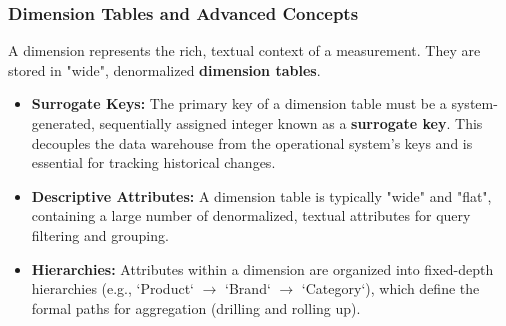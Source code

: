 \subsubsection{Dimension Tables and Advanced Concepts}
A dimension represents the rich, textual context of a measurement. They are stored in "wide", denormalized \textbf{dimension tables}.
\begin{itemize}
    \item \textbf{Surrogate Keys:} The primary key of a dimension table must be a system-generated, sequentially assigned integer known as a \textbf{surrogate key}. This decouples the data warehouse from the operational system's keys and is essential for tracking historical changes.
    \item \textbf{Descriptive Attributes:} A dimension table is typically "wide" and "flat", containing a large number of denormalized, textual attributes for query filtering and grouping.
    \item \textbf{Hierarchies:} Attributes within a dimension are organized into fixed-depth hierarchies (e.g., `Product` $\to$ `Brand` $\to$ `Category`), which define the formal paths for aggregation (drilling and rolling up).
\end{itemize}


